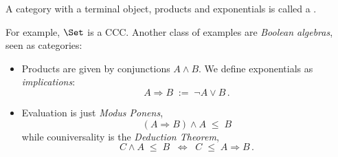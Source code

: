 \documentclass{svmult}
\begin{document}
\begin{mydefinition}%
A category with a terminal object, products and exponentials is called a . \deq
\end{mydefinition}
%
For example, $\Set$ is a CCC. Another class of examples are \emph{Boolean algebras}, seen as categories:
\begin{itemize}
  \item Products are given by conjunctions $A \wedge B$. We define exponentials as \emph{implications}:
    \[ A \Rightarrow B \; := \; \neg A \vee B\,. \]
  \item Evaluation is just \emph{Modus Ponens},
    \[ (A \Rightarrow B) \wedge A \;\leq\; B \]
    while couniversality is the \emph{Deduction Theorem},
    \[ C \wedge A \;\leq\; B \;\; \Longleftrightarrow \;\; C \;\leq\; A \Rightarrow B\,. \]
\end{itemize}
\end{document}
